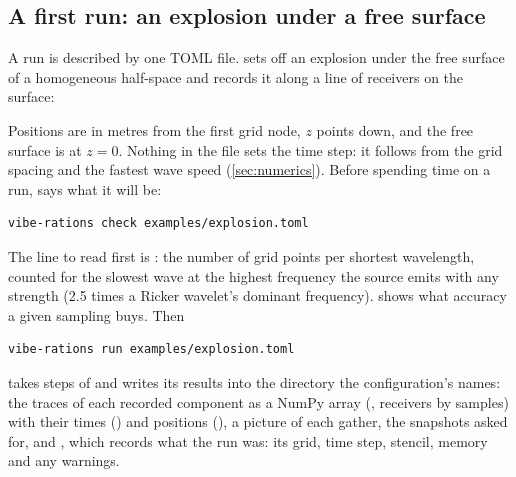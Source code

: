 \subsection{A first run: an explosion under a free surface}
\label{sec:usage:explosion}

A run is described by one TOML file.  sets off an explosion
 under the free surface of a homogeneous half-space and
records it along a line of  receivers on the surface:


Positions are in metres from the first grid node, $z$ points down, and the free surface is at
$z = 0$. Nothing in the file sets the time step: it follows from the grid spacing and the
fastest wave speed (\cref{sec:numerics}). Before spending time on a run,  says
what it will be:
\begin{lstlisting}[style=shell]
vibe-rations check examples/explosion.toml
\end{lstlisting}

The line to read first is : the number of grid points per shortest
wavelength, counted for the slowest wave at the highest frequency the source emits with any
strength (2.5 times a Ricker wavelet's dominant frequency).  shows what
accuracy a given sampling buys. Then
\begin{lstlisting}[style=shell]
vibe-rations run examples/explosion.toml
\end{lstlisting}
takes  steps of  and writes its results into the directory the configuration's
\code{[output]} names: the traces of each recorded component as a NumPy array (,
receivers by samples) with their times () and positions
(), a picture of each gather, the snapshots asked for, and
, which records what the run was: its grid, time step, stencil, memory and any
warnings.

